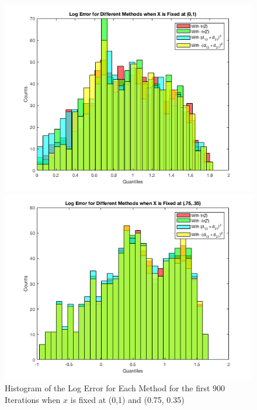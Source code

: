 \documentclass[answers]{exam}
\begin{document}
        \begin{figure}[H]
    \centering
    \caption{Histogram of the Log Error for Each Method for the first 900 Iterations when $x$ is fixed at (0,1) and (0.75, 0.35)}
    \begin{minipage}{.5\textwidth}
        \centering
        \includegraphics[width=1.1\textwidth, height=0.3\textheight]{Problem8hcf.png}
    \end{minipage}%
    \begin{minipage}{0.5\textwidth}
        \centering
        \includegraphics[width=1.1\textwidth, height=0.3\textheight]{Problem8hvf.png}
    \end{minipage}
    \label{fhist}
\end{figure}
    
\end{document}
